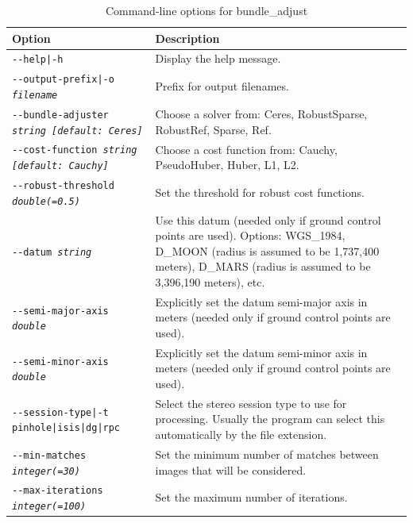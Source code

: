 \begin{longtable}{|l|p{7.5cm}|}
\caption{Command-line options for bundle\_adjust}
\label{tbl:bundleadjust}
\endfirsthead
\endhead
\endfoot
\endlastfoot
\hline
Option & Description \\ \hline \hline
\texttt{-\/-help|-h} & Display the help message. \\ \hline

\texttt{-\/-output-prefix|-o \textit{filename}} & Prefix for output filenames. \\ \hline

\texttt{-\/-bundle-adjuster \textit{string [default: Ceres]}} & Choose a solver from:
Ceres, RobustSparse, RobustRef, Sparse, Ref. \\ \hline

\texttt{-\/-cost-function \textit{string [default: Cauchy]}} & Choose a cost function
from: Cauchy, PseudoHuber, Huber, L1, L2. \\ \hline

\texttt{-\/-robust-threshold \textit{double(=0.5)}} & Set the threshold for robust
cost functions.\\ \hline

\texttt{-\/-datum \textit{string}} & Use this datum (needed only if ground control
points are used). Options: WGS\_1984, D\_MOON (radius is assumed to be 1,737,400 meters), D\_MARS
(radius is assumed to be 3,396,190 meters), etc.  \\ \hline

\texttt{-\/-semi-major-axis \textit{double}} & Explicitly set the datum semi-major axis
in meters (needed only if ground control points are used).\\ \hline
\texttt{-\/-semi-minor-axis \textit{double}} & Explicitly set the datum semi-minor axis
in meters (needed only if ground control points are used).\\ \hline

\texttt{-\/-session-type|-t pinhole|isis|dg|rpc} & Select the stereo
session type to use for processing. Usually the program can select this
automatically by the file extension.\\ \hline

\texttt{-\/-min-matches \textit{integer(=30)}} & Set the minimum number of matches
between images that will be considered. \\ \hline

\texttt{-\/-max-iterations \textit{integer(=100)}} & Set the maximum
number of iterations. \\ \hline


\end{longtable}
